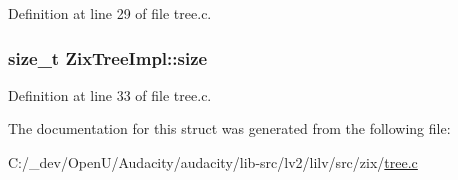 Definition at line 29 of file tree.\+c.

\subsubsection[{\texorpdfstring{size}{size}}]{\setlength{\rightskip}{0pt plus 5cm}size\+\_\+t Zix\+Tree\+Impl\+::size}\hypertarget{struct_zix_tree_impl_ab95a2d9063598f768d431bc9aba370ec}{}\label{struct_zix_tree_impl_ab95a2d9063598f768d431bc9aba370ec}


Definition at line 33 of file tree.\+c.



The documentation for this struct was generated from the following file\+:\begin{DoxyCompactItemize}
\item 
C\+:/\+\_\+dev/\+Open\+U/\+Audacity/audacity/lib-\/src/lv2/lilv/src/zix/\hyperlink{lilv_2src_2zix_2tree_8c}{tree.\+c}\end{DoxyCompactItemize}
